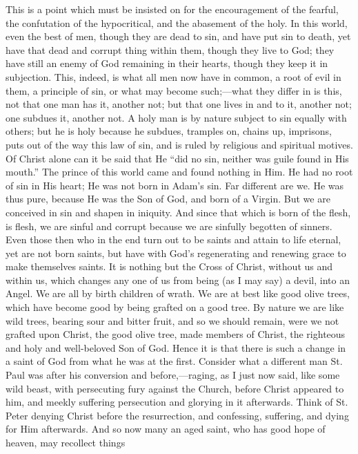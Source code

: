 This is a point which must be insisted on for the encouragement of
the fearful, the confutation of the hypocritical, and the abasement of
the holy. In this world, even the best of men, though they are dead to
sin, and have put sin to death, yet have that dead and corrupt thing
within them, though they live to God; they have still an enemy of God
remaining in their hearts, though they keep it in subjection. This,
indeed, is what all men now have in common, a root of evil in them, a
principle of sin, or what may become such;—what they differ in is
this, not that one man has it, another not; but that one lives in and
to it, another not; one subdues it, another not. A holy man is by
nature subject to sin equally with others; but he is holy because he
subdues, tramples on, chains up, imprisons, puts out of the way this
law of sin, and is ruled by religious and spiritual motives. Of Christ
alone can it be said that He ``did no sin, neither was guile found
in His mouth.'' The prince of this world came and found nothing in
Him. He had no root of sin in His heart; He was not born in Adam's
sin. Far different are we. He was thus pure, because He was the Son of
God, and born of a Virgin. But we are conceived in sin and shapen in
iniquity. And since that which is born of the flesh, is flesh, we are
sinful and corrupt because we are sinfully begotten of sinners. Even
those then who in the end turn out to be saints and attain to life
eternal, yet are not born saints, but have with God's regenerating and
renewing grace to make themselves saints. It is nothing but the Cross
of Christ, without us and within us, which changes any one of us from
being (as I may say) a devil, into an Angel. We are all by birth
children of wrath. We are at best like good olive trees, which have
become good by being grafted on a good tree. By nature we are like
wild trees, bearing sour and bitter fruit, and so we should remain,
were we not grafted upon Christ, the good olive tree, made members of
Christ, the righteous and holy and well-beloved Son of God. Hence it
is that there is such a change in a saint of God from what he was at
the first. Consider what a different man St. Paul was after his
conversion and before,—raging, as I just now said, like some wild
beast, with persecuting fury against the Church, before Christ
appeared to him, and meekly suffering persecution and glorying in it
afterwards. Think of St. Peter denying Christ before the resurrection,
and confessing, suffering, and dying for Him afterwards. And so now
many an aged saint, who has good hope of heaven, may recollect things
